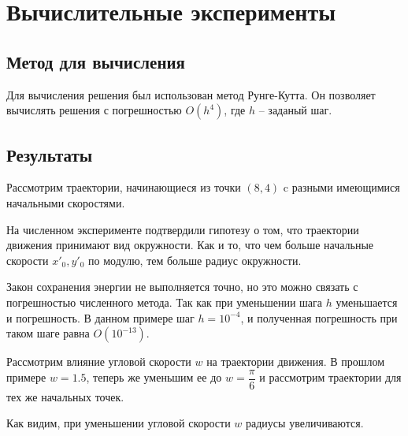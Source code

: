 \pagebreak

\section{Вычислительные эксперименты}

	\subsection{Метод для вычисления}
		Для вычисления решения был использован метод Рунге-Кутта. Он позволяет вычислять решения с погрешностью \( O(h^4) \), где \( h \) -- заданый шаг.

		

	\subsection{Результаты}
		Рассмотрим траектории, начинающиеся из точки \( (8, 4) \) c разными имеющимися начальными скоростями.


		На численном эксперименте подтвердили гипотезу о том, что траектории движения принимают вид окружности. Как и то, что чем больше начальные скорости \( x'_0, y'_0 \) по модулю, тем больше радиус окружности.

		Закон сохранения энергии не выполняется точно, но это можно связать с погрешностью численного метода. Так как при уменьшении шага \( h \) уменьшается и погрешность. В данном примере шаг \( h = 10^{-4} \), и полученная погрешность при таком шаге равна \( O(10^{-13}) \).

		Рассмотрим влияние угловой скорости \( w \) на траектории движения. В прошлом примере \( w  = 1.5 \), 
		теперь же уменьшим ее до \( w = \dfrac{\pi}{6} \) и рассмотрим траектории для тех же начальных точек.


		Как видим, при уменьшении угловой скорости \( w \) радиусы увеличиваются. 

\pagebreak